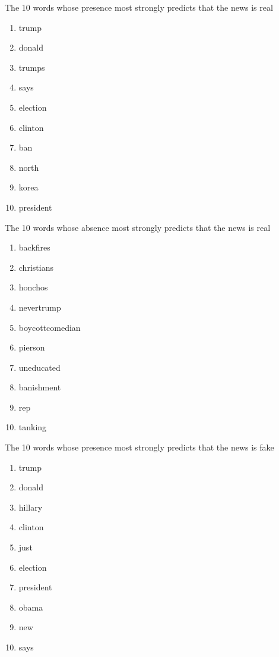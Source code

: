 \documentclass[10pt,letterpaper]{article}
\begin{document}
\begin{enumerate}
\begin{enumerate}
			The 10 words whose presence most strongly predicts that the news is real
			\begin{enumerate}
				\item trump
				\item donald
				\item trumps
				\item says
				\item election
				\item clinton
				\item ban
				\item north
				\item korea
				\item president
			\end{enumerate}
		
			The 10 words whose absence most strongly predicts that the news is real
			\begin{enumerate}
				\item backfires
				\item christians
				\item honchos
				\item nevertrump
				\item boycottcomedian
				\item pierson
				\item uneducated
				\item banishment
				\item rep
				\item tanking
			\end{enumerate}
		
			The 10 words whose presence most strongly predicts that the news is fake
			\begin{enumerate}
				\item trump
				\item donald
				\item hillary
				\item clinton
				\item just
				\item election
				\item president
				\item obama
				\item new
				\item says
			\end{enumerate}
		

\end{enumerate}
\end{enumerate}
\end{document}
